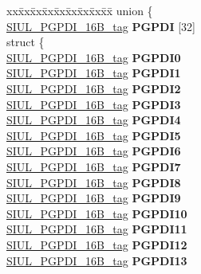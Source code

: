 \begin{DoxyCompactItemize}
\begin{tabbing}
\end{tabbing}\item 
\mbox{\label{structSIU__tag_ad8626e68d8559e2ee5336456c351573c}} 
\begin{tabbing}
xx\=xx\=xx\=xx\=xx\=xx\=xx\=xx\=xx\=\kill
union \{\\
\>\mbox{\hyperlink{unionSIUL__PGPDI__16B__tag}{SIUL\_PGPDI\_16B\_tag}} {\bfseries PGPDI} \mbox{[}32\mbox{]}\\
\mbox{\label{unionSIU__tag_1_1_0D1548_adfad22ffb0341e6aae8638470fbc2add}} 
\>struct \{\\
\>\>\mbox{\hyperlink{unionSIUL__PGPDI__16B__tag}{SIUL\_PGPDI\_16B\_tag}} {\bfseries PGPDI0}\\
\>\>\mbox{\hyperlink{unionSIUL__PGPDI__16B__tag}{SIUL\_PGPDI\_16B\_tag}} {\bfseries PGPDI1}\\
\>\>\mbox{\hyperlink{unionSIUL__PGPDI__16B__tag}{SIUL\_PGPDI\_16B\_tag}} {\bfseries PGPDI2}\\
\>\>\mbox{\hyperlink{unionSIUL__PGPDI__16B__tag}{SIUL\_PGPDI\_16B\_tag}} {\bfseries PGPDI3}\\
\>\>\mbox{\hyperlink{unionSIUL__PGPDI__16B__tag}{SIUL\_PGPDI\_16B\_tag}} {\bfseries PGPDI4}\\
\>\>\mbox{\hyperlink{unionSIUL__PGPDI__16B__tag}{SIUL\_PGPDI\_16B\_tag}} {\bfseries PGPDI5}\\
\>\>\mbox{\hyperlink{unionSIUL__PGPDI__16B__tag}{SIUL\_PGPDI\_16B\_tag}} {\bfseries PGPDI6}\\
\>\>\mbox{\hyperlink{unionSIUL__PGPDI__16B__tag}{SIUL\_PGPDI\_16B\_tag}} {\bfseries PGPDI7}\\
\>\>\mbox{\hyperlink{unionSIUL__PGPDI__16B__tag}{SIUL\_PGPDI\_16B\_tag}} {\bfseries PGPDI8}\\
\>\>\mbox{\hyperlink{unionSIUL__PGPDI__16B__tag}{SIUL\_PGPDI\_16B\_tag}} {\bfseries PGPDI9}\\
\>\>\mbox{\hyperlink{unionSIUL__PGPDI__16B__tag}{SIUL\_PGPDI\_16B\_tag}} {\bfseries PGPDI10}\\
\>\>\mbox{\hyperlink{unionSIUL__PGPDI__16B__tag}{SIUL\_PGPDI\_16B\_tag}} {\bfseries PGPDI11}\\
\>\>\mbox{\hyperlink{unionSIUL__PGPDI__16B__tag}{SIUL\_PGPDI\_16B\_tag}} {\bfseries PGPDI12}\\
\>\>\mbox{\hyperlink{unionSIUL__PGPDI__16B__tag}{SIUL\_PGPDI\_16B\_tag}} {\bfseries PGPDI13}\\

\end{tabbing}
\end{DoxyCompactItemize}
